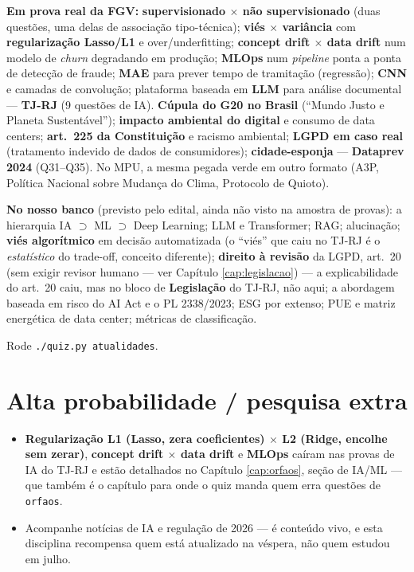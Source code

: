 \begin{jacaiu}
\textbf{Em prova real da FGV:} \textbf{supervisionado $\times$ não
supervisionado} (duas questões, uma delas de associação tipo-técnica);
\textbf{viés $\times$ variância} com \textbf{regularização Lasso/L1} e
over/underfitting; \textbf{concept drift $\times$ data drift} num modelo de
\emph{churn} degradando em produção; \textbf{MLOps} num \emph{pipeline}
ponta a ponta de detecção de fraude; \textbf{MAE} para prever tempo de
tramitação (regressão); \textbf{CNN} e camadas de convolução; plataforma
baseada em \textbf{LLM} para análise documental --- \textbf{TJ-RJ} (9
questões de IA). \textbf{Cúpula do G20 no Brasil} (``Mundo Justo e Planeta
Sustentável''); \textbf{impacto ambiental do digital} e consumo de data
centers; \textbf{art.\ 225 da Constituição} e racismo ambiental;
\textbf{LGPD em caso real} (tratamento indevido de dados de consumidores);
\textbf{cidade-esponja} --- \textbf{Dataprev 2024} (Q31--Q35). No MPU, a
mesma pegada verde em outro formato (A3P, Política Nacional sobre Mudança do
Clima, Protocolo de Quioto).

\textbf{No nosso banco} (previsto pelo edital, ainda não visto na amostra de
provas): a hierarquia IA $\supset$ ML $\supset$ Deep Learning; LLM e
Transformer; RAG; alucinação; \textbf{viés algorítmico} em decisão
automatizada (o ``viés'' que caiu no TJ-RJ é o \emph{estatístico} do
trade-off, conceito diferente); \textbf{direito à revisão} da LGPD,
art.\ 20 (sem exigir revisor humano --- ver Capítulo \ref{cap:legislacao})
--- a explicabilidade do art.\ 20 caiu, mas no bloco de
\textbf{Legislação} do TJ-RJ, não aqui; a abordagem baseada em risco do AI
Act e o PL 2338/2023; ESG por extenso; PUE e matriz energética de data
center; métricas de classificação.

Rode \texttt{./quiz.py atualidades}.
\end{jacaiu}

\section{Alta probabilidade / pesquisa extra}

\begin{itemize}
\item \textbf{Regularização L1 (Lasso, zera coeficientes) $\times$ L2 (Ridge,
encolhe sem zerar)}, \textbf{concept drift $\times$ data drift} e
\textbf{MLOps} caíram nas provas de IA do TJ-RJ e estão detalhados no
Capítulo \ref{cap:orfaos}, seção de IA/ML --- que também é o capítulo para
onde o quiz manda quem erra questões de \texttt{orfaos}.
\item Acompanhe notícias de IA e regulação de 2026 --- é conteúdo vivo, e
esta disciplina recompensa quem está atualizado na véspera, não quem
estudou em julho.
\end{itemize}
